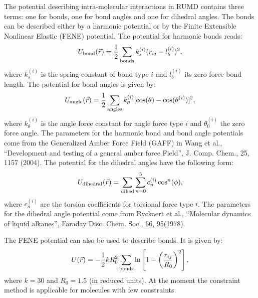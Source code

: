 \documentclass[a4paper]{article}
\newcommand{\textind}[1]{\mbox{\scriptsize{#1}}}
\begin{document}
The potential describing intra-molecular interactions in RUMD contains three terms: one for
bonds, one for bond angles and one for dihedral angles.
The bonds can be described either by a harmonic potential or by the Finite Extensible Nonlinear Elastic (FENE) potential.
The potential for harmonic bonds reads:
\begin{equation}
U_{\textind{bond}}(\vec{r}) =  \frac{1}{2}\sum_{\textind{bonds}}k_s^{(i)} (r_{ij}-l_b^{(i)})^2,
\end{equation}
where $k_s^{(i)}$ is the spring constant of bond type $i$ and $l_b^{(i)}$ its zero force bond length.
The potential for bond angles is given by:
\begin{equation}
U_{\textind{angle}}(\vec{r}) = \frac{1}{2}\sum_{\textind{angles}}k_\theta^{(i)} [\cos(\theta)-\cos(\theta^{(i)})]^2, 
\end{equation}
where $k_\theta^{(i)}$ is the angle force constant for angle force type $i$ and
$\theta_0^{(i)}$ the zero force angle.
The parameters for the harmonic bond and bond angle potentials come from the Generalized Amber Force Field
(GAFF) in Wang et al., ``Development and testing of a general amber
force Field'', J. Comp. Chem., 25, 1157 (2004).
The potential for the dihedral angles have the following form:
\begin{equation}
U_{\textind{dihedral}}(\vec{r}) = \sum_{\textind{dihed}} \sum_{n=0}^5 c_n^{(i)} \cos^n(\phi),
\end{equation}
where $c_n^{(i)}$ are the torsion
coefficients for torsional force type $i$. The parameters for the dihedral angle potential
come from Ryckaert et al., ``Molecular dynamics of liquid alkanes'', Faraday Disc. Chem. Soc., 66, 95(1978).

The FENE potential can also be used to describe bonds. It is given by:
\begin{equation}
U(\vec{r}) = -\frac{1}{2}kR_0^2\sum_{\textind{bonds}} \ln\left[ 1 -\left(\frac{r_{ij}}{R_0}\right)^2\right],
\end{equation}
where $k=30$ and $R_0=1.5$ (in reduced units). At the moment
the constraint method is applicable for molecules with few
constraints.
\end{document}
